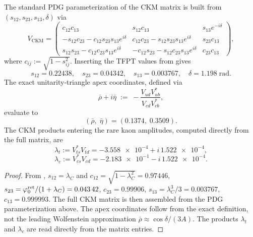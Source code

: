 \begin{proposition}
\label{prop:exact-ckm}
The standard PDG parameterization of the CKM matrix is built from
$(s_{12},s_{23},s_{13},\delta)$ via
\[
V_{\mathrm{CKM}}
=
\begin{pmatrix}
c_{12}c_{13} & s_{12}c_{13} & s_{13}e^{-i\delta}\\
-s_{12}c_{23}-c_{12}s_{23}s_{13}e^{i\delta}
& c_{12}c_{23}-s_{12}s_{23}s_{13}e^{i\delta}
& s_{23}c_{13}\\
s_{12}s_{23}-c_{12}c_{23}s_{13}e^{i\delta}
& -c_{12}s_{23}-s_{12}c_{23}s_{13}e^{i\delta}
& c_{23}c_{13}
\end{pmatrix},
\]
where $c_{ij}:=\sqrt{1-s_{ij}^2}$. Inserting the TFPT values from 
gives
\begin{equation}
\label{eq:tfpt-ckm-numerics}
s_{12}=\num{0.22438},
\quad
s_{23}=\num{0.04342},
\quad
s_{13}=\num{0.003767},
\quad
\delta=\num{1.198}\;\mathrm{rad}.
\end{equation}
The exact unitarity-triangle apex coordinates, defined via
\begin{equation}
\label{eq:rhobar-etabar-exact}
\bar\rho+i\bar\eta
\;:=\;
-\frac{V_{ud}V_{ub}^*}{V_{cd}V_{cb}^*},
\end{equation}
evaluate to
\begin{equation}
\label{eq:apex-values}
(\bar\rho,\;\bar\eta)
=
(0.1374,\;0.3509).
\end{equation}
The CKM products entering the rare kaon amplitudes, computed directly from
the full matrix, are
\begin{equation}
\label{eq:lambda-t-exact}
\lambda_t := V_{ts}^*V_{td}
= -\num{3.558e-4}+i\,\num{1.522e-4},
\end{equation}
\begin{equation}
\label{eq:lambda-c-exact}
\lambda_c := V_{cs}^*V_{cd}
= -\num{2.183e-1}-i\,\num{1.522e-4}.
\end{equation}
\end{proposition}

\begin{proof}
From , $s_{12}=\lambda_C$ and
$c_{12}=\sqrt{1-\lambda_C^2}=\num{0.97446}$,
$s_{23}=\varphi_{0}^{\mathrm{ret}}/(1+\lambda_C)=\num{0.04342}$,
$c_{23}=\num{0.99906}$,
$s_{13}=\lambda_C^3/3=\num{0.003767}$,
$c_{13}=\num{0.999993}$.
The full CKM matrix is then assembled from the PDG parameterization above.
The apex coordinates  follow from the exact
definition, not the leading Wolfenstein approximation
$\bar\rho\approx\cos\delta/(3A)$.
The products $\lambda_t$ and $\lambda_c$ are read directly from the matrix
entries.
\end{proof}

